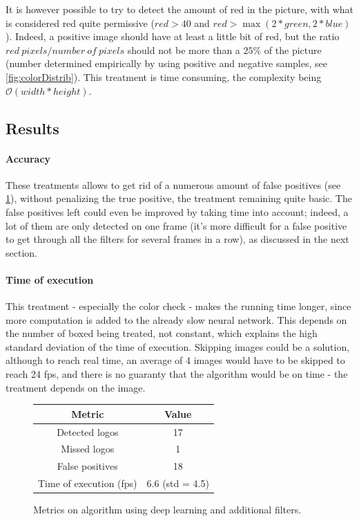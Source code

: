 \documentclass[12pt]{article}%
\begin{document}
It is however possible to try to detect the amount of red in the picture, with what is considered red quite permissive ($red > 40$ and $red > \max(2*green, 2*blue)$). Indeed, a positive image should have at least a little bit of red, but the ratio $red\ pixels/number\ of\ pixels$ should not be more than a $25\%$ of the picture (number determined empirically by using positive and negative samples, see \ref{fig:colorDistrib}). This treatment is time consuming, the complexity being $\mathcal{O}(width*height)$.

\subsection{Results}

\paragraph{Accuracy}
These treatments allows to get rid of a numerous amount of false positives (see \ref{fig:correctedDeepLearningResults}), without penalizing the true positive, the treatment remaining quite basic. The false positives left could even be improved by taking time into account; indeed, a lot of them are only detected on one frame (it's more difficult for a false positive to get through all the filters for several frames in a row), as discussed in the next section. 

\paragraph{Time of execution}
This treatment - especially the color check - makes the running time longer, since more computation is added to the already slow neural network. This depends on the number of boxed being treated, not constant, which explains the high standard deviation of the time of execution. Skipping images could be a solution, although to reach real time, an average of 4 images would have to be skipped to reach 24 fps, and there is no guaranty that the algorithm would be on time - the treatment depends on the image.

\begin{figure}
    \centering
        \begin{tabular}{c | c}
        Metric                  & Value \\
        \hline
        Detected logos          & 17 \\
        Missed logos            & 1 \\
        False positives         & 18 \\
        Time of execution (fps) & 6.6 (std = 4.5) \\
        \end{tabular}
    \caption{Metrics on algorithm using deep learning and additional filters.}
    \label{fig:correctedDeepLearningResults}
\end{figure}
\end{document}
